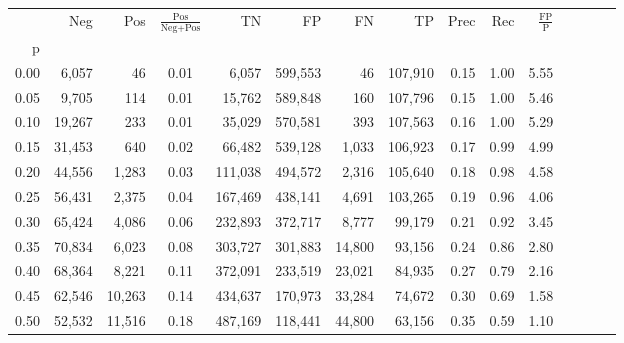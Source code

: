 \begin{tabular}{rrrcrrrrrrrrrrr}
\toprule
{} &     Neg &     Pos & $\frac{\text{Pos}}{\text{Neg}+\text{Pos}}$ &       TN &       FP &       FN &       TP &  Prec &   Rec & $\frac{\text{FP}}{\text{P}}$ \\
p    &         &         &                                            &          &          &          &          &       &       &                              \\
\midrule
0.00 &   6,057 &      46 &                                       0.01 &    6,057 &  599,553 &       46 &  107,910 &  0.15 &  1.00 &                         5.55 \\
0.05 &   9,705 &     114 &                                       0.01 &   15,762 &  589,848 &      160 &  107,796 &  0.15 &  1.00 &                         5.46 \\
0.10 &  19,267 &     233 &                                       0.01 &   35,029 &  570,581 &      393 &  107,563 &  0.16 &  1.00 &                         5.29 \\
0.15 &  31,453 &     640 &                                       0.02 &   66,482 &  539,128 &    1,033 &  106,923 &  0.17 &  0.99 &                         4.99 \\
0.20 &  44,556 &   1,283 &                                       0.03 &  111,038 &  494,572 &    2,316 &  105,640 &  0.18 &  0.98 &                         4.58 \\
0.25 &  56,431 &   2,375 &                                       0.04 &  167,469 &  438,141 &    4,691 &  103,265 &  0.19 &  0.96 &                         4.06 \\
0.30 &  65,424 &   4,086 &                                       0.06 &  232,893 &  372,717 &    8,777 &   99,179 &  0.21 &  0.92 &                         3.45 \\
0.35 &  70,834 &   6,023 &                                       0.08 &  303,727 &  301,883 &   14,800 &   93,156 &  0.24 &  0.86 &                         2.80 \\
0.40 &  68,364 &   8,221 &                                       0.11 &  372,091 &  233,519 &   23,021 &   84,935 &  0.27 &  0.79 &                         2.16 \\
0.45 &  62,546 &  10,263 &                                       0.14 &  434,637 &  170,973 &   33,284 &   74,672 &  0.30 &  0.69 &                         1.58 \\
0.50 &  52,532 &  11,516 &                                       0.18 &  487,169 &  118,441 &   44,800 &   63,156 &  0.35 &  0.59 &                         1.10 \\

\end{tabular}
